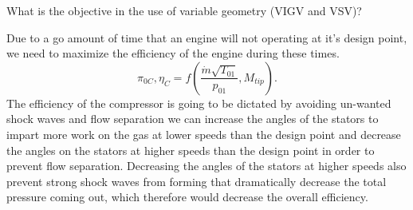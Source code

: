 \documentclass[12pt]{exam}
\begin{document}
\begin{questions}
\newpage 
\begin{question}
What is the objective in the use of variable geometry (VIGV and VSV)?
\end{question}
\begin{solutionorbox}[\stretch{1}]
Due to a go amount of time that an engine will not operating at it's design point, we need to 
maximize the efficiency of the engine during these times.
\[
\pi_{0C}, \eta_C = f \left( \frac{\dot{m} \sqrt{T_{01}}}{p_{01}}, M_{tip} \right).
\]
The efficiency of the compressor is going to be dictated by avoiding un-wanted shock waves and flow
separation we can increase the angles of the stators to impart more work on the gas at lower speeds than 
the design point and decrease the angles on the stators at higher speeds than the design point in order to 
prevent flow separation. Decreasing the angles of the stators at higher speeds also prevent strong shock waves 
from forming that dramatically decrease the total pressure coming out, which therefore would decrease the overall efficiency.
\end{solutionorbox}



\end{questions}
\end{document}
